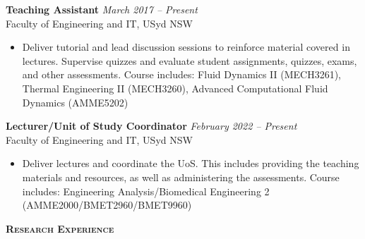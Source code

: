 \documentclass[letterpaper, 10pt]{article}
\newenvironment{changemargin}[2]{%
  \begin{list}{}{%
      \setlength{\topsep}{0pt}%
      \setlength{\leftmargin}{#1}%
      \setlength{\rightmargin}{#2}%
      \setlength{\listparindent}{\parindent}%
      \setlength{\itemindent}{\parindent}%
      \setlength{\parsep}{\parskip}%
    }%
  \item[]}{\end{list}
}
\newcommand{\lineover}{
  \begin{changemargin}{-0.05in}{-0.05in}
    \vspace*{-8pt}
    \hrulefill \\
    \vspace*{-2pt}
  \end{changemargin}
}
\newcommand{\header}[1]{
  \begin{changemargin}{-0.5in}{-0.5in}
    \textbf{\scshape{#1}}\\
    \lineover
  \end{changemargin}
}
\newenvironment{body} {
  \vspace*{-16pt}
  \begin{changemargin}{-0.25in}{-0.5in}
  }
  {\end{changemargin}
}
\begin{document}
\begin{body}
	\vspace{14pt}
	\textbf{Teaching Assistant} \hfill \emph{March 2017 -- Present}\\
	Faculty of Engineering and IT, USyd \hfill NSW
	\vspace{-2pt}
	\begin{itemize}
		\setlength{\itemindent}{0in}
		\setlength{\itemsep}{0in}
		\item Deliver tutorial and lead discussion sessions to reinforce material covered in
		lectures. Supervise quizzes and evaluate student assignments, quizzes, exams, and other assessments.
		Course includes: Fluid Dynamics II (MECH3261), Thermal Engineering II (MECH3260), Advanced Computational Fluid Dynamics (AMME5202)
	\end{itemize}

\smallskip

	\textbf{Lecturer/Unit of Study Coordinator} \hfill \emph{February 2022 -- Present}\\
	Faculty of Engineering and IT, USyd \hfill NSW
	\vspace{-2pt}
	\begin{itemize}
		\setlength{\itemindent}{0in}
		\setlength{\itemsep}{0in}
		\item Deliver lectures and coordinate the UoS. This includes providing the teaching materials and resources, as well as administering the assessments.
		Course includes: Engineering Analysis/Biomedical Engineering 2 (AMME2000/BMET2960/BMET9960)
	\end{itemize}
\end{body}
\smallskip
\header{Research Experience}
\end{document}
